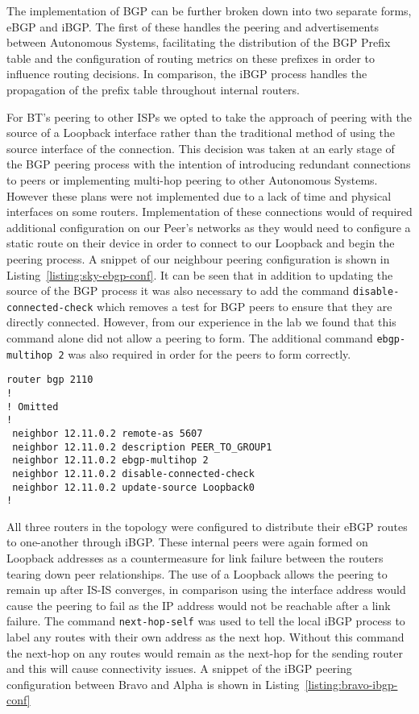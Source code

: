 The implementation of BGP can be further broken down into two separate forms,
eBGP and iBGP. The first of these handles the peering and advertisements
between Autonomous Systems, facilitating the distribution of the BGP Prefix
table and the configuration of routing metrics on these prefixes in order to
influence routing decisions. In comparison, the iBGP process handles the
propagation of the prefix table throughout internal routers.

For BT's peering to other ISPs we opted to take the approach of peering with
the source of a Loopback interface rather than the traditional method of using
the source interface of the connection. This decision was taken at an early
stage of the BGP peering process with the intention of introducing redundant
connections to peers or implementing multi-hop peering to other Autonomous
Systems. However these plans were not implemented due to a lack of time and
physical interfaces on some routers. Implementation of these connections would
of required additional configuration on our Peer's networks as they would need
to configure a static route on their device in order to connect to our Loopback
and begin the peering process. A snippet of our neighbour peering configuration
is shown in Listing~\ref{listing:sky-ebgp-conf}. It can be seen that in
addition to updating the source of the BGP process it was also necessary to add
the command \texttt{disable-connected-check} which removes a test for BGP peers
to ensure that they are directly connected. However, from our experience in the
lab we found that this command alone did not allow a peering to form. The
additional command \texttt{ebgp-multihop 2} was also required in order for the
peers to form correctly.

\begin{lstlisting}[caption={BT-Sky eBGP Configuration}, label={listing:sky-ebgp-conf}]
router bgp 2110
!
! Omitted
!
 neighbor 12.11.0.2 remote-as 5607
 neighbor 12.11.0.2 description PEER_TO_GROUP1
 neighbor 12.11.0.2 ebgp-multihop 2
 neighbor 12.11.0.2 disable-connected-check
 neighbor 12.11.0.2 update-source Loopback0
!
\end{lstlisting}

All three routers in the topology were configured to distribute their eBGP
routes to one-another through iBGP. These internal peers were again formed on
Loopback addresses as a countermeasure for link failure between the routers
tearing down peer relationships. The use of a Loopback allows the peering to
remain up after IS-IS converges, in comparison using the interface address
would cause the peering to fail as the IP address would not be reachable after
a link failure. The command \texttt{next-hop-self} was used to tell the local
iBGP process to label any routes with their own address as the next hop.
Without this command the next-hop on any routes would remain as the next-hop
for the sending router and this will cause connectivity issues. A snippet of
the iBGP peering configuration between Bravo and Alpha is shown in
Listing~\ref{listing:bravo-ibgp-conf}

